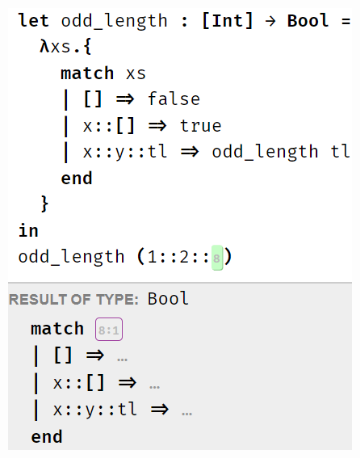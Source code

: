 \begin{figure}
\begin{subfigure}[t]{0.45\textwidth}
\centering
\includegraphics[scale=0.47,valign=t]{imgs/pat_match_exp_holes.png}

\end{subfigure}
\end{figure}
